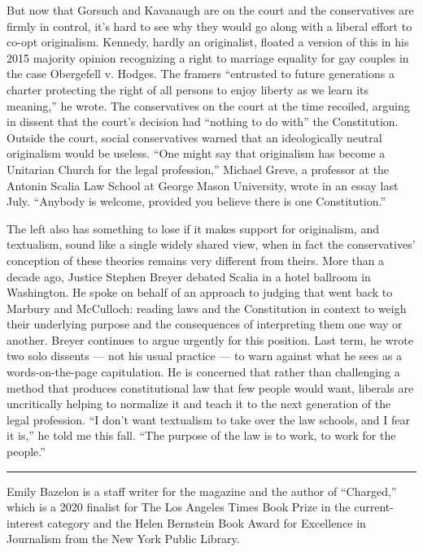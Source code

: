 But now that Gorsuch and Kavanaugh are on the court and the
conservatives are firmly in control, it's hard to see why they would go
along with a liberal effort to co-opt originalism. Kennedy, hardly an
originalist, floated a version of this in his 2015 majority opinion
recognizing a right to marriage equality for gay couples in the case
Obergefell v. Hodges. The framers ``entrusted to future generations a
charter protecting the right of all persons to enjoy liberty as we learn
its meaning,'' he wrote. The conservatives on the court at the time
recoiled, arguing in dissent that the court's decision had ``nothing to
do with'' the Constitution. Outside the court, social conservatives
warned that an ideologically neutral originalism would be useless. ``One
might say that originalism has become a Unitarian Church for the legal
profession,'' Michael Greve, a professor at the Antonin Scalia Law
School at George Mason University, wrote in an essay last July.
``Anybody is welcome, provided you believe there is one Constitution.''

The left also has something to lose if it makes support for originalism,
and textualism, sound like a single widely shared view, when in fact the
conservatives' conception of these theories remains very different from
theirs. More than a decade ago, Justice Stephen Breyer debated Scalia in
a hotel ballroom in Washington. He spoke on behalf of an approach to
judging that went back to Marbury and McCulloch: reading laws and the
Constitution in context to weigh their underlying purpose and the
consequences of interpreting them one way or another. Breyer continues
to argue urgently for this position. Last term, he wrote two solo
dissents --- not his usual practice --- to warn against what he sees as
a words-on-the-page capitulation. He is concerned that rather than
challenging a method that produces constitutional law that few people
would want, liberals are uncritically helping to normalize it and teach
it to the next generation of the legal profession. ``I don't want
textualism to take over the law schools, and I fear it is,'' he told me
this fall. ``The purpose of the law is to work, to work for the
people.''

\begin{center}\rule{0.5\linewidth}{\linethickness}\end{center}

Emily Bazelon is a staff writer for the magazine and the author of
``Charged,'' which is a 2020 finalist for The Los Angeles Times Book
Prize in the current-interest category and the Helen Bernstein Book
Award for Excellence in Journalism from the New York Public Library.

